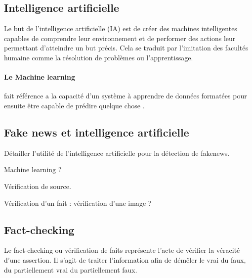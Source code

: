 \subsection{Intelligence artificielle}

Le but de l'intelligence artificielle (IA) est de créer des machines intelligentes capables de comprendre leur environnement et de performer des actions leur permettant d'atteindre un but précis. Cela se traduit par l'imitation des facultés humaine comme la résolution de problèmes ou l'apprentissage.

\paragraph{Le Machine learning} fait référence a la capacité d'un système à apprendre de données formatées pour ensuite être capable de prédire quelque chose \cite{MichaelCopeland}.


\subsection{Fake news et intelligence artificielle}

Détailler l'utilité de l'intelligence artificielle pour la détection de fakenews.

Machine learning ?

Vérification de source.

Vérification d'un fait : vérification d'une image ?


\subsection{Fact-checking}






Le fact-checking ou vérification de faits représente l'acte de vérifier la véracité d'une assertion. Il s'agit de traiter l'information afin de démêler le vrai du faux, du partiellement vrai du partiellement faux.

